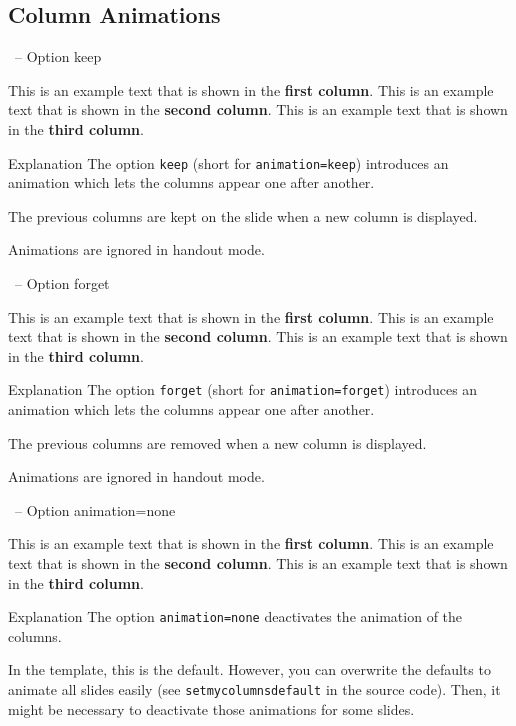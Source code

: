 \documentclass[
	aspectratio=169, %
	8pt, %
]{beamer}
\begin{document}
\subsection{Column Animations}
\begin{frame}{\insertsubsection\ -- Option keep}
	\begin{mycolumns}[columns=3,keep] %
		This is an example text that is shown in the \textbf{first column}.
	\mynextcolumn
		This is an example text that is shown in the \textbf{second column}.
	\mynextcolumn
		This is an example text that is shown in the \textbf{third column}.
	\end{mycolumns}
	\vfill
	\begin{note}{Explanation}
		The option \texttt{keep} (short for \texttt{animation=keep}) introduces an animation which lets the columns appear one after another.

		The previous columns are kept on the slide when a new column is displayed.

		Animations are ignored in handout mode.
	\end{note}
\end{frame}

\begin{frame}{\insertsubsection\ -- Option forget}
	\begin{mycolumns}[columns=3,forget] %
		This is an example text that is shown in the \textbf{first column}.
	\mynextcolumn
		This is an example text that is shown in the \textbf{second column}.
	\mynextcolumn
		This is an example text that is shown in the \textbf{third column}.
	\end{mycolumns}
	\vfill
	\begin{note}{Explanation}
		The option \texttt{forget} (short for \texttt{animation=forget}) introduces an animation which lets the columns appear one after another.

		The previous columns are removed when a new column is displayed.

		Animations are ignored in handout mode.
	\end{note}
\end{frame}

\begin{frame}{\insertsubsection\ -- Option animation=none}
	\begin{mycolumns}[columns=3,animation=none]
		This is an example text that is shown in the \textbf{first column}.
	\mynextcolumn
		This is an example text that is shown in the \textbf{second column}.
	\mynextcolumn
		This is an example text that is shown in the \textbf{third column}.
	\end{mycolumns}
	\vfill
	\begin{note}{Explanation}
		The option \texttt{animation=none} deactivates the animation of the columns.

		In the template, this is the default. However, you can overwrite the defaults to animate all slides easily (see \texttt{setmycolumnsdefault} in the source code). Then, it might be necessary to deactivate those animations for some slides.
	\end{note}
\end{frame}
\end{document}
